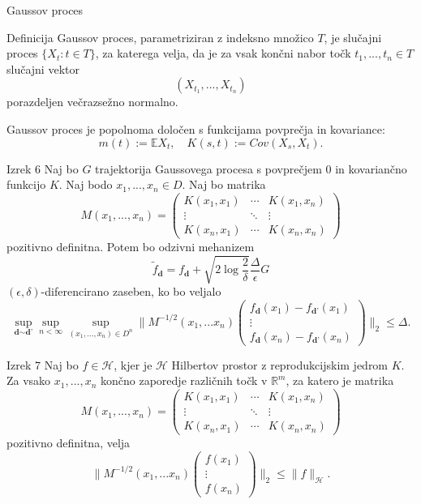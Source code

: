 \documentclass{beamer}
\begin{document}
\begin{frame}{Gaussov proces}
\begin{block}{Definicija}
Gaussov proces, parametriziran z indeksno množico $T$, je slučajni proces $\{X_t : t \in T\}$, za katerega velja, da je za vsak končni nabor točk $t_1,...,t_n \in T$ slučajni vektor
$$
(X_{t_1},...,X_{t_n})
$$
porazdeljen večrazsežno normalno.
\end{block}

Gaussov proces je popolnoma določen s funkcijama povprečja  in kovariance: 
$$m(t) := \mathbb{E}X_t, \quad K(s,t) := Cov(X_s,X_t).$$
\end{frame}

\begin{frame}
\begin{block}{Izrek 6}
Naj bo $G$ trajektorija Gaussovega procesa s povprečjem 0 in kovariančno funkcijo $K$. Naj bodo $x_1,...,x_n \in D$. Naj bo matrika
$$
M(x_1,...,x_n) = 
 \begin{pmatrix}
  K(x_1,x_1) & \cdots & K(x_1,x_n) \\
  \vdots    & \ddots & \vdots  \\
  K(x_n,x_1) & \cdots & K(x_n,x_n) 
 \end{pmatrix}
$$
pozitivno definitna. Potem bo odzivni mehanizem 
$$
\widetilde{f}_{\textbf{d}} = f_{\textbf{d}} + \sqrt{2\log{\frac{2}{\delta}}} \frac{\Delta}{\epsilon}G
$$
$(\epsilon, \delta)$-diferencirano zaseben, ko bo veljalo
$$
\sup_{\textbf{d} \sim \textbf{d'}} \sup_{n < \infty} \sup_{(x_1,...,x_n) \in D^n} 
\bigg\|M^{-1/2}(x_1,...x_n)
\begin{pmatrix}
  f_{\textbf{d}}(x_1)-f_{\textbf{d'}}(x_1)  \\
  \vdots     \\
  f_{\textbf{d}}(x_n)-f_{\textbf{d'}}(x_n)
 \end{pmatrix}
\bigg\|_2 \leq \Delta. 
$$
\end{block}
\end{frame}

\begin{frame}
\begin{block}{Izrek 7}
Naj bo $f \in \mathcal{H}$, kjer je $\mathcal{H}$ Hilbertov prostor z reprodukcijskim jedrom $K$. Za vsako $x_1, ..., x_n$ končno zaporedje različnih točk v $\mathbb{R}^m$, za katero je matrika
$$
M(x_1,...,x_n) = 
 \begin{pmatrix}
  K(x_1,x_1) & \cdots & K(x_1,x_n) \\
  \vdots    & \ddots & \vdots  \\
  K(x_n,x_1) & \cdots & K(x_n,x_n) 
 \end{pmatrix}
$$
pozitivno definitna, velja
$$
\bigg\|M^{-1/2}(x_1,...x_n)
\begin{pmatrix}
  f(x_1)  \\
  \vdots     \\
  f(x_n)
 \end{pmatrix}
\bigg\|_2 \leq \|f\|_{\mathcal{H}}.
$$
\end{block}
\end{frame}
\end{document}
